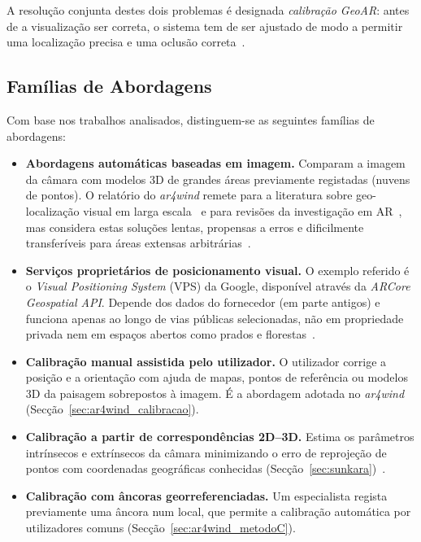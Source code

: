 A resolução conjunta destes dois problemas é designada \textit{calibração GeoAR}: antes de a visualização ser correta, o sistema tem de ser ajustado de modo a permitir uma localização precisa e uma oclusão correta~\cite{ar4wind2023}.

\subsection{Famílias de Abordagens}
\label{sec:sota_familias}

Com base nos trabalhos analisados, distinguem-se as seguintes famílias de abordagens:

\begin{itemize}
    \item \textbf{Abordagens automáticas baseadas em imagem.} Comparam a imagem da câmara com modelos 3D de grandes áreas previamente registadas (nuvens de pontos). O relatório do \textit{ar4wind} remete para a literatura sobre geo-localização visual em larga escala~\cite{zamir2018geoloc} e para revisões da investigação em AR~\cite{kim2018ismar}, mas considera estas soluções lentas, propensas a erros e dificilmente transferíveis para áreas extensas arbitrárias~\cite[Sec.~1.2 e 2.2.2.1]{ar4wind2023}.
    \item \textbf{Serviços proprietários de posicionamento visual.} O exemplo referido é o \textit{Visual Positioning System} (VPS) da Google, disponível através da \textit{ARCore Geospatial API}. Depende dos dados do fornecedor (em parte antigos) e funciona apenas ao longo de vias públicas selecionadas, não em propriedade privada nem em espaços abertos como prados e florestas~\cite[Sec.~2.4]{ar4wind2023}.
    \item \textbf{Calibração manual assistida pelo utilizador.} O utilizador corrige a posição e a orientação com ajuda de mapas, pontos de referência ou modelos 3D da paisagem sobrepostos à imagem. É a abordagem adotada no \textit{ar4wind} (Secção~\ref{sec:ar4wind_calibracao}).
    \item \textbf{Calibração a partir de correspondências 2D--3D.} Estima os parâmetros intrínsecos e extrínsecos da câmara minimizando o erro de reprojeção de pontos com coordenadas geográficas conhecidas (Secção~\ref{sec:sunkara})~\cite{sunkara2025}.
    \item \textbf{Calibração com âncoras georreferenciadas.} Um especialista regista previamente uma âncora num local, que permite a calibração automática por utilizadores comuns (Secção~\ref{sec:ar4wind_metodoC}).
\end{itemize}

